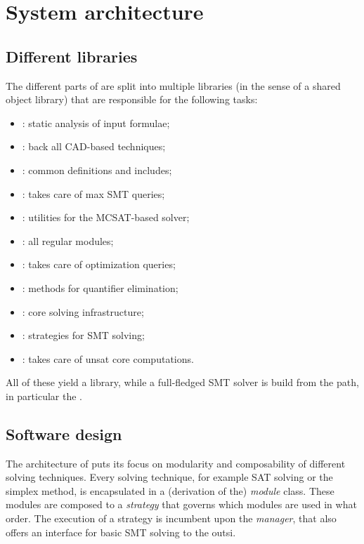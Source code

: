 \chapter{System architecture}\label{chapter:generalframework}

\section{Different libraries}

The different parts of \smtrat are split into multiple libraries (in the sense of a shared object library) that are responsible for the following tasks:
\begin{itemize}
	\item {}: static analysis of input formulae;
	\item {}: back all CAD-based techniques;
	\item {}: common definitions and includes;
	\item {}: takes care of max SMT queries;
	\item {}: utilities for the MCSAT-based solver;
	\item {}: all regular \smtrat modules;
	\item {}: takes care of optimization queries;
	\item {}: methods for quantifier elimination;
	\item {}: core solving infrastructure;
	\item {}: strategies for SMT solving;
	\item {}: takes care of unsat core computations.
\end{itemize}

All of these yield a library, while a full-fledged SMT solver is build from the  path, in particular the .

\section{Software design}

The architecture of \smtrat puts its focus on modularity and composability of different solving techniques.
Every solving technique, for example SAT solving or the simplex method, is encapsulated in a (derivation of the) \emph{module} class.
These modules are composed to a \emph{strategy} that governs which modules are used in what order.
The execution of a strategy is incumbent upon the \emph{manager}, that also offers an interface for basic SMT solving to the outsi.

